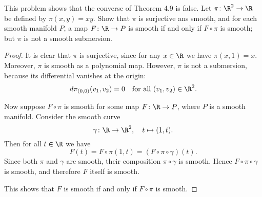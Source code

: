 \begin{problem}
    This problem shows that the converse of Theorem 4.9 is false. 
    Let $\pi \colon \R^2 \to \R$ be defined by $\pi(x,y) = xy$. Show that 
    $\pi$ is surjective ans smooth, and for each smooth manifold $P$, a map $F \colon \R \to P$ is smooth if and only if $F \circ \pi$ is smooth; but $\pi$ is not a smooth submersion.
    \begin{proof}
    It is clear that $\pi$ is surjective, since for any $x \in \R$ we have $\pi(x,1) = x$.  
    Moreover, $\pi$ is smooth as a polynomial map. However, $\pi$ is not a submersion, 
    because its differential vanishes at the origin:
    \[
    d\pi_{(0,0)}(v_1,v_2) = 0 \quad \text{for all } (v_1,v_2) \in \R^2.
    \]

    Now suppose $F \circ \pi$ is smooth for some map $F \colon \R \to P$, 
    where $P$ is a smooth manifold.  
    Consider the smooth curve
    \[
    \gamma \colon \R \to \R^2, \quad t \mapsto (1,t).
    \]
    Then for all $t \in \R$ we have
    \[
    F(t) = F \circ \pi(1,t) = (F \circ \pi \circ \gamma)(t).
    \]
    Since both $\pi$ and $\gamma$ are smooth, their composition $\pi \circ \gamma$ is smooth.  
    Hence $F \circ \pi \circ \gamma$ is smooth, and therefore $F$ itself is smooth.  

    This shows that $F$ is smooth if and only if $F \circ \pi$ is smooth. 
    \end{proof}
\end{problem}

